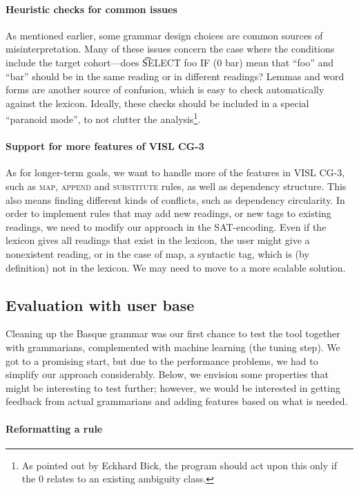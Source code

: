 {{\paragraph{Heuristic checks for common issues} 
As mentioned earlier, some grammar design choices are common sources
of misinterpretation.  Many of these issues concern the case where the
conditions include the target cohort---does \t{SELECT foo IF (0 bar)}
mean that ``foo'' and ``bar'' should be in the same reading or in
different readings?  Lemmas and word forms are another source of
confusion, which is easy to check automatically against the lexicon.
Ideally, these checks should be included in a special ``paranoid
mode'', to not clutter the analysis\footnote{As pointed out by Eckhard
  Bick, the program should act upon this only if the 0 relates to an
  existing ambiguity class.}.


\paragraph{Support for more features of VISL CG-3}
As for longer-term goals, we want to handle more of the features in
VISL CG-3, such as \textsc{map}, \textsc{append} and
\textsc{substitute} rules, as well as dependency structure.  This also
means finding different kinds of conflicts, such as dependency
circularity.  In order to implement rules that may add new readings,
or new tags to existing readings, we need to modify our approach in
the SAT-encoding.  Even if the lexicon gives all readings that exist
in the lexicon, the user might give a nonexistent reading, or in the
case of {\sc map}, a syntactic tag, which is (by definition) not in
the lexicon. We may need to move to a more scalable solution.

\subsection{Evaluation with user base}

Cleaning up the Basque grammar was our first chance to test the tool
together with grammarians, complemented with machine learning (the
tuning step). We got to a promising start, but due to the performance
problems, we had to simplify our approach considerably. Below, we
envision some properties that might be interesting to test further;
however, we would be interested in getting feedback from actual
grammarians and adding features based on what is needed.

\paragraph{Reformatting a rule}

}}
